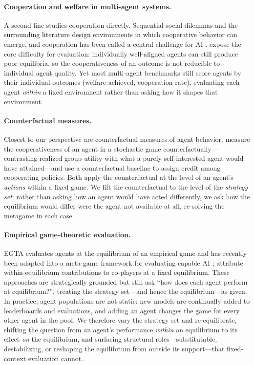\documentclass[sigconf,anonymous]{aamas}
\begin{document}
\paragraph{Cooperation and welfare in multi-agent systems.} A second line studies cooperation directly. Sequential social dilemmas \citep{leibo2017multiagent} and the surrounding literature \citep{Du2023ARO} design environments in which cooperative behavior can emerge, and cooperation has been called a central challenge for AI \citep{dafoe2021cooperative, Dafoe2020OpenPI}. \citet{conitzer2023foundations} expose the core difficulty for evaluation: individually well-aligned agents can still produce poor equilibria, so the cooperativeness of an outcome is not reducible to individual agent quality. Yet most multi-agent benchmarks still score agents by their individual outcomes (welfare achieved, cooperation rate), evaluating each agent \emph{within} a fixed environment rather than asking how it shapes that environment.

\paragraph{Counterfactual measures.} Closest to our perspective are counterfactual measures of agent behavior. \citet{barnett2025measuring} measure the cooperativeness of an agent in a stochastic game counterfactually---contrasting realized group utility with what a purely self-interested agent would have attained---and \citet{foerster2018counterfactual} use a counterfactual baseline to assign credit among cooperating policies. Both apply the counterfactual at the level of an agent's \emph{actions} within a fixed game. We lift the counterfactual to the level of the \emph{strategy set}: rather than asking how an agent would have acted differently, we ask how the equilibrium would differ were the agent not available at all, re-solving the metagame in each case.

\paragraph{Empirical game-theoretic evaluation.} EGTA \citep{wellman2025empirical} evaluates agents at the equilibrium of an empirical game and has recently been adapted into a meta-game framework for evaluating capable AI \citep{Li2024AME, smithline2025measuring, Luo2026}; \citet{liu2025reevaluating} attribute within-equilibrium contributions to co-players at a fixed equilibrium. These approaches are strategically grounded but still ask ``how does each agent perform at equilibrium?'', treating the strategy set---and hence the equilibrium---as given. In practice, agent populations are not static: new models are continually added to leaderboards and evaluations, and adding an agent changes the game for every other agent in the pool. We therefore vary the strategy set and re-equilibrate, shifting the question from an agent's performance \emph{within} an equilibrium to its effect \emph{on} the equilibrium, and surfacing structural roles---substitutable, destabilizing, or reshaping the equilibrium from outside its support---that fixed-context evaluation cannot.
\end{document}
